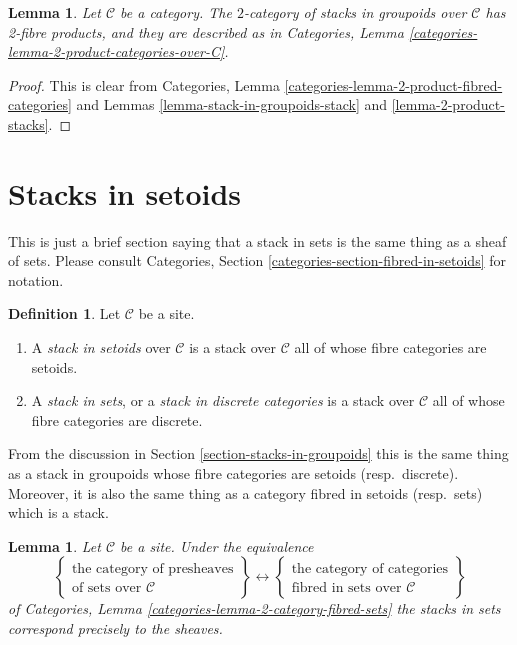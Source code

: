 \documentclass{stacks-project}
\theoremstyle{plain}
\newtheorem{lemma}[subsection]{Lemma}
\theoremstyle{definition}
\newtheorem{definition}[subsection]{Definition}
\theoremstyle{remark}
\numberwithin{equation}{subsection}
\begin{document}
\begin{lemma}
\label{lemma-2-product-stacks-in-groupoids}
Let $\mathcal{C}$ be a category.
The $2$-category of stacks in groupoids over $\mathcal{C}$
has 2-fibre products, and they are described as in
Categories, Lemma \ref{categories-lemma-2-product-categories-over-C}.
\end{lemma}

\begin{proof}
This is clear from
Categories, Lemma \ref{categories-lemma-2-product-fibred-categories}
and Lemmas \ref{lemma-stack-in-groupoids-stack}
and \ref{lemma-2-product-stacks}.
\end{proof}








\section{Stacks in setoids}
\label{section-stacks-in-setoids}

\noindent
This is just a brief section saying that a stack in sets
is the same thing as a sheaf of sets. Please consult
Categories, Section \ref{categories-section-fibred-in-setoids}
for notation.

\begin{definition}
\label{definition-stack-in-sets}
Let $\mathcal{C}$ be a site.
\begin{enumerate}
\item A {\it stack in setoids} over $\mathcal{C}$
is a stack over $\mathcal{C}$ all of whose fibre categories are
setoids.
\item A {\it stack in sets}, or a {\it stack in discrete categories}
is a stack over $\mathcal{C}$ all of whose fibre categories are discrete.
\end{enumerate}
\end{definition}

\noindent
From the discussion in
Section \ref{section-stacks-in-groupoids}
this is the same thing as a stack in groupoids whose fibre categories
are setoids (resp.\ discrete). Moreover, it is also the same thing
as a category fibred in setoids (resp.\ sets) which is a stack.

\begin{lemma}
\label{lemma-when-stack-in-sets}
Let $\mathcal{C}$ be a site. Under the equivalence
$$
\left\{
\begin{matrix}
\text{the category of presheaves}\\
\text{of sets over }\mathcal{C}
\end{matrix}
\right\}
\leftrightarrow
\left\{
\begin{matrix}
\text{the category of categories}\\
\text{fibred in sets over }\mathcal{C}
\end{matrix}
\right\}
$$
of
Categories, Lemma \ref{categories-lemma-2-category-fibred-sets}
the stacks in sets correspond precisely to the sheaves.
\end{lemma}
\end{document}
